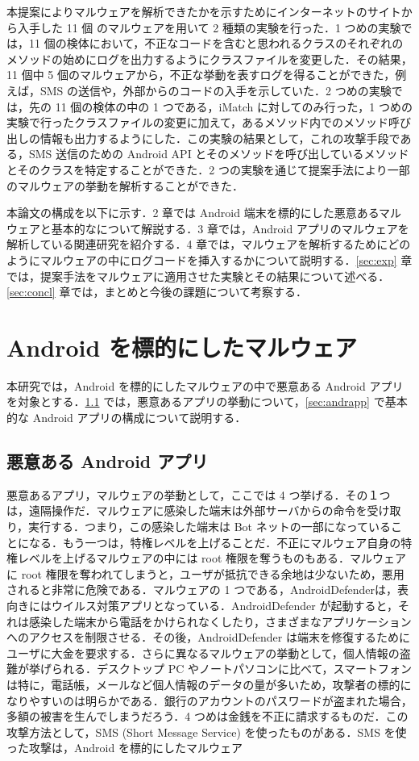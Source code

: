 \documentclass[12pt]{jsarticle}
\begin{document}
本提案によりマルウェアを解析できたかを示すためにインターネットのサイトから入手した 11 個 のマルウェアを用いて 2 種類の実験を行った．1 つめの実験では，11 個の検体において，不正なコードを含むと思われるクラスのそれぞれのメソッドの始めにログを出力するようにクラスファイルを変更した．その結果，11 個中 5 個のマルウェアから，不正な挙動を表すログを得ることができた，例えば，SMS の送信や，外部からのコードの入手を示していた．2 つめの実験では，先の 11 個の検体の中の 1 つである，iMatch に対してのみ行った，1 つめの実験で行ったクラスファイルの変更に加えて，あるメソッド内でのメソッド呼び出しの情報も出力するようにした．この実験の結果として，これの攻撃手段である，SMS 送信のための Android API とそのメソッドを呼び出しているメソッドとそのクラスを特定することができた．2 つの実験を通じて提案手法により一部のマルウェアの挙動を解析することができた．

本論文の構成を以下に示す．2 章では Android 端末を標的にした悪意あるマルウェアと基本的なについて解説する．3 章では，Android アプリのマルウェアを解析している関連研究を紹介する．4 章では，マルウェアを解析するためにどのようにマルウェアの中にログコードを挿入するかについて説明する．\ref{sec:exp} 章では，提案手法をマルウェアに適用させた実験とその結果について述べる．\ref{sec:concl} 章では，まとめと今後の課題について考察する．

\newpage

\section{Android  を標的にしたマルウェア}
本研究では，Android を標的にしたマルウェアの中で悪意ある Android アプリを対象とする．\ref{sec:malware} では，悪意あるアプリの挙動について，\ref{sec:andrapp} で基本的な Android アプリの構成について説明する．
\subsection{悪意ある Android  アプリ}
\label{sec:malware}
悪意あるアプリ，マルウェアの挙動として，ここでは 4 つ挙げる．その１つは，遠隔操作だ．マルウェアに感染した端末は外部サーバからの命令を受け取り，実行する．つまり，この感染した端末は Bot ネットの一部になっていることになる．もう一つは，特権レベルを上げることだ．不正にマルウェア自身の特権レベルを上げるマルウェアの中には root 権限を奪うものもある．マルウェアに root 権限を奪われてしまうと，ユーザが抵抗できる余地は少ないため，悪用されると非常に危険である．マルウェアの 1 つである，AndroidDefenderは，表向きにはウイルス対策アプリとなっている．AndroidDefender が起動すると，それは感染した端末から電話をかけられなくしたり，さまざまなアプリケーションへのアクセスを制限させる．その後，AndroidDefender は端末を修復するためにユーザに大金を要求する．さらに異なるマルウェアの挙動として，個人情報の盗難が挙げられる．デスクトップ PC やノートパソコンに比べて，スマートフォンは特に，電話帳，メールなど個人情報のデータの量が多いため，攻撃者の標的になりやすいのは明らかである．銀行のアカウントのパスワードが盗まれた場合，多額の被害を生んでしまうだろう．4 つめは金銭を不正に請求するものだ．この攻撃方法として，SMS (Short Message Service) を使ったものがある．SMS を使った攻撃は，Android を標的にしたマルウェア
 
\end{document}
